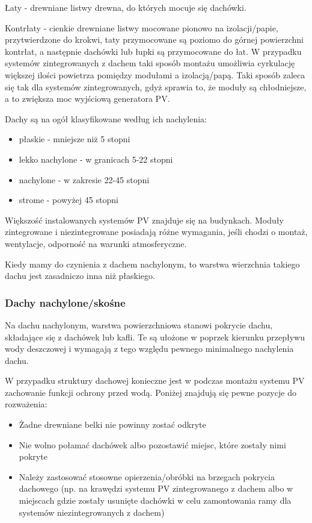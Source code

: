 \documentclass[12pt,a4paper]{article}
\begin{document}
Łaty - drewniane listwy drewna, do których mocuje się dachówki. 

Kontrłaty - cienkie drewniane listwy mocowane pionowo na izolacji/papie, 
przytwierdzone do krokwi, taty przymocowane są poziomo do górnej 
powierzchni kontrłat, a następnie dachówki lub łupki są przymocowane do 
łat. W przypadku systemów zintegrowanych z dachem taki sposób montażu 
umożliwia cyrkulację większej ilości powietrza pomiędzy modułami a 
izolacją/papą. Taki sposób zaleca się tak dla systemów zintegrowanych, 
gdyż sprawia to, że moduły są chłodniejsze, a to zwiększa moc wyjściową 
generatora PV. 

Dachy są na ogół klasyfikowane według ich nachylenia: 

\begin{itemize}
\item płaskie - mniejsze niż 5 stopni 
\item lekko nachylone - w granicach 5-22 stopni 
\item nachylone - w zakresie 22-45 stopni 
\item strome - powyżej 45 stopni 
\end{itemize}
 

Większość instalowanych systemów PV znajduje się na budynkach. Moduły 
zintegrowane i niezintegrowane posiadają różne wymagania, jeśli chodzi o 
montaż, wentylacje, odporność na warunki atmosferyczne. 

Kiedy mamy do czynienia z dachem nachylonym, to warstwa wierzchnia 
takiego dachu jest zasadniczo inna niż płaskiego. 

 

\subsubsection{Dachy nachylone/skośne}


Na dachu nachylonym, warstwa powierzchniowa stanowi pokrycie dachu, 
składające się z dachówek lub kafli. Te są ułożone w poprzek kierunku 
przepływu wody deszczowej i wymagają z tego względu pewnego minimalnego 
nachylenia dachu. 

W przypadku struktury dachowej konieczne jest w podczas montażu systemu 
PV zachowanie funkcji ochrony przed wodą. Poniżej znajdują się pewne 
pozycje do rozważenia: 

\begin{itemize}
\item Żadne drewniane belki nie powinny zostać odkryte 
\item Nie wolno połamać dachówek albo pozostawić miejsc, które zostały 
nimi pokryte 
\item Należy zastosować stosowne opierzenia/obróbki na brzegach pokrycia 
dachowego (np. na krawędzi systemu PV zintegrowanego z dachem albo w 
miejscach gdzie zostały usunięte dachówki w celu zamontowania ramy dla 
systemów niezintegrowanych z dachem) 
\end{itemize}
 
\end{document}
